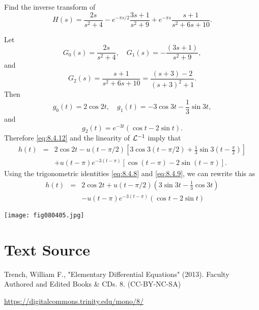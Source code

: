 \documentclass{ximera}
\begin{document}
\begin{example}\label{example:8.4.8}
 Find the inverse transform of
$$
H(s)=\frac{2s}{s^2+4}-e^{-\pi s/2} \frac{3s+1}{s^2+9}+e^{-\pi
s}\frac{s+1}{s^2+6s+10}.
$$
\begin{explanation}
Let
$$
G_0(s)=\frac{2s}{s^2+4},\quad G_1(s)=-\frac{(3s+1)}{s^2+9},
$$
and
$$
G_2(s)=\frac{s+1}{s^2+6s+10}=\frac{(s+3)-2}{(s+3)^2+1}.
$$
Then
$$
g_0(t)=2\cos 2t,\quad g_1(t)=-3\cos 3t-\frac{1}{3}\sin 3t,
$$
and
$$
g_2(t)=e^{-3t}(\cos t-2\sin t).
$$
Therefore \eqref{eq:8.4.12} and the linearity of ${\cal L}^{-1}$
imply that
\begin{eqnarray*}
h(t)&=&2\cos 2t-u(t-\pi/2)\left[3\cos
3(t-\pi/2)+\frac{1}{3}\sin 3\left(t-\frac{\pi}{2}\right)\right]\\
&&+u(t-\pi)e^{-3(t-\pi)}\left[\cos (t-\pi)-2\sin (t-\pi)\right].
\end{eqnarray*}
Using the trigonometric identities  \eqref{eq:8.4.8} and
\eqref{eq:8.4.9}, we can rewrite this as
\begin{equation} \label{eq:8.4.13}
\begin{array}{rcl}
h(t)&=&2\cos 2t+u(t-\pi/2)\left(3\sin 3t-
\frac{1}{3}\cos 3t\right)\\
&&-u(t-\pi)e^{-3(t-\pi)} (\cos t-2\sin t)
\end{array}
\end{equation}
\begin{image}
 \texttt{[image: fig080405.jpg]}
 \end{image}
\end{explanation}
\end{example}


\section*{Text Source}
Trench, William F., "Elementary Differential Equations" (2013). Faculty Authored and Edited Books \& CDs. 8. (CC-BY-NC-SA)

\href{https://digitalcommons.trinity.edu/mono/8/}{https://digitalcommons.trinity.edu/mono/8/}
\end{document}
